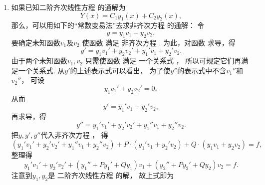 \begin{enumerate}
	\item%
	如果已知二阶齐次线性方程  的通解为\begin{equation*}
		Y(x) = C_1 y_1(x) + C_2 y_2(x),
	\end{equation*}
	那么，可以用如下的“常数变易法”去求非齐次方程  的通解：
	令\begin{equation}\label{equation:微分方程.二阶非齐次线性微分方程的通解设想}
		y = y_1 v_1 + y_2 v_2,
	\end{equation}
	要确定未知函数\(v_1\)及\(v_2\)
	使函数  满足
	非齐次方程 .
	为此，对函数  求导，得\begin{equation*}
		y' = y_1 v_1' + y_2 v_2' + y_1' v_1 + y_2' v_2.
	\end{equation*}
	由于两个未知函数\(v_1,v_2\)
	只需使函数  满足
	一个关系式 ，
	所以可规定它们再满足一个关系式.
	从\(y'\)的上述表示式可以看出，
	为了使\(y''\)的表示式中不含\(v_1''\)和\(v_2''\)，
	可设\begin{equation}\label{equation:微分方程.二阶非齐次线性微分方程的额外条件1}
		y_1 v_1' + y_2 v_2' = 0,
	\end{equation}
	从而\begin{equation*}
		y' = y_1' v_1 + y_2' v_2,
	\end{equation*}
	再求导，得\begin{equation*}
		y'' = y_1' v_1' + y_2' v_2' + y_1'' v_1 + y_2'' v_2.
	\end{equation*}
	把\(y,y',y''\)代入非齐次方程 ，
	得\begin{equation*}
		(y_1' v_1' + y_2' v_2' + y_1'' v_1 + y_2'' v_2)
		+P\cdot(y_1' v_1 + y_2' v_2) + Q\cdot(y_1 v_1 + y_2 v_2) = f,
	\end{equation*}
	整理得\begin{equation*}
		y_1' v_1' + y_2' v_2'
		+ (y_1'' + P y_1' + Q y_1) v_1
		+ (y_2'' + P y_2' + Q y_2) v_2
		= f.
	\end{equation*}
	注意到\(y_1,y_2\)是
	二阶齐次线性方程  的解，
	故上式即为

\end{enumerate}
